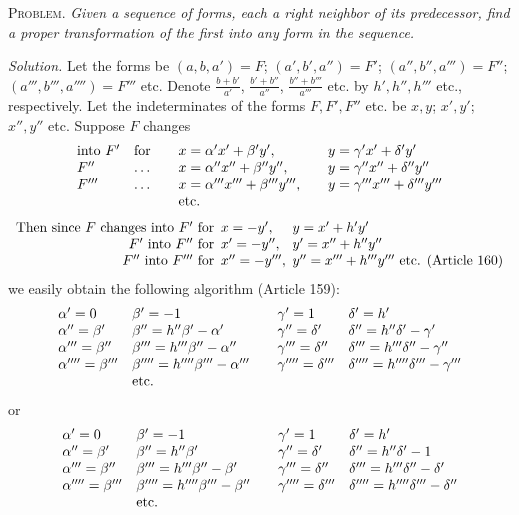 \textsc{Problem.} \emph{Given a sequence of forms, each a right neighbor of its predecessor, find a proper transformation of the first into any form in the sequence.}

\emph{Solution.} Let the forms be $(a,b,a')=F$; $(a',b',a'')=F'$; $(a'',b'',a''')=F''$; $(a''',b''',a'''')=F'''$ etc. Denote $\frac{b+b'}{a'}$, $\frac{b'+b''}{a''}$, $\frac{b''+b'''}{a'''}$ etc. by $h',h'',h'''$ etc., respectively. Let the indeterminates of the forms $F,F',F''$ etc. be $x,y$; $x',y'$; $x'',y''$ etc. Suppose $F$ changes
\[
\begin{array}{ll@{\qquad}l@{\qquad}l}
\text{into }F'&\text{for}&x=\alpha'x'+\beta'y',&y=\gamma'x'+\delta'y'\\
F''&\ldots&x=\alpha''x''+\beta''y'',&y=\gamma''x''+\delta''y''\\
F'''&\ldots&x=\alpha'''x'''+\beta'''y''',&y=\gamma'''x'''+\delta'''y'''\\
&&\text{etc.}&
\end{array}
\]
{\small\setlength{\arraycolsep}{3pt}
\[
\begin{array}{l@{\enspace}l@{\enspace}l}
\text{Then since }F\text{ changes into }F'\text{ for}&x=-y',&y=x'+h'y'\\
\hfill F'\text{ into }F''\text{ for}&x'=-y'',&y'=x''+h''y''\\
\hfill F''\text{ into }F'''\text{ for}&x''=-y''',&y''=x'''+h'''y'''\text{ etc. (Article\ 160)}
\end{array}
\]
}
we easily obtain the following algorithm (Article 159):
\[
\begin{array}{ll@{\qquad}ll}
\alpha'=0&\beta'=-1&\gamma'=1&\delta'=h'\\
\alpha''=\beta'&\beta''=h''\beta'-\alpha'&\gamma''=\delta'&\delta''=h''\delta'-\gamma'\\
\alpha'''=\beta''&\beta'''=h'''\beta''-\alpha''&\gamma'''=\delta''&\delta'''=h'''\delta''-\gamma''\\
\alpha''''=\beta'''&\beta''''=h''''\beta'''-\alpha'''&\gamma''''=\delta'''&\delta''''=h''''\delta'''-\gamma'''\\
&\text{etc.}&&
\end{array}
\]
or
\[
\begin{array}{ll@{\qquad}ll}
\alpha'=0&\beta'=-1&\gamma'=1&\delta'=h'\\
\alpha''=\beta'&\beta''=h''\beta'&\gamma''=\delta'&\delta''=h''\delta'-1\\
\alpha'''=\beta''&\beta'''=h'''\beta''-\beta'&\gamma'''=\delta''&\delta'''=h'''\delta''-\delta'\\
\alpha''''=\beta'''&\beta''''=h''''\beta'''-\beta''&\gamma''''=\delta'''&\delta''''=h''''\delta'''-\delta''\\
&\text{etc.}&&
\end{array}
\]

